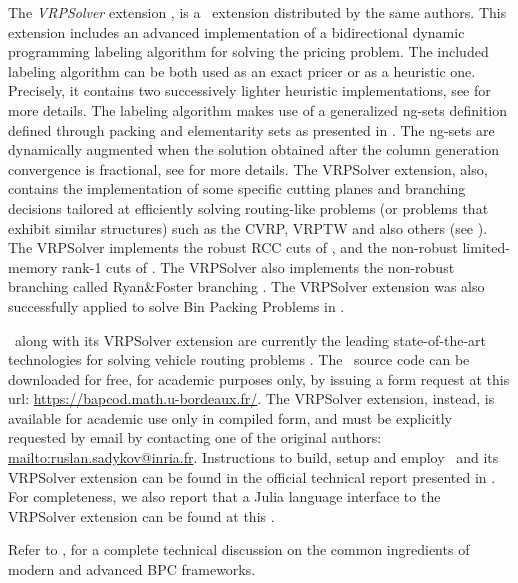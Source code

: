 The \textit{VRPSolver} extension \parencite{pessoa2020generic}, is
a \bapcod\ extension distributed by the same authors.
This extension includes an
advanced implementation of a bidirectional dynamic programming labeling algorithm
\parencite{sadykov2021bucket} for solving the pricing problem.
The included labeling algorithm
can be both used as an exact pricer or as a heuristic one.
Precisely, it contains two successively lighter heuristic implementations,
see \textcite{sadykov2021bucket} for more details.
The labeling algorithm makes use of a generalized ng-sets definition \parencite{baldacci2011}
defined through packing and elementarity sets as presented in \textcite{pessoa2020generic}.
The ng-sets are dynamically augmented \parencite{roberti2014}
when the solution obtained after the column generation convergence
is fractional,
see \textcite{pessoa2020generic} for more details.
The VRPSolver extension, also,
contains the implementation of some
specific cutting planes and branching decisions
tailored at efficiently solving routing-like problems
(or problems that exhibit similar structures)
such as the CVRP, VRPTW and also others (see \cite{pessoa2020generic}).
The VRPSolver implements the robust RCC cuts of \textcite{laporte1983},
and the non-robust limited-memory rank-1 cuts of \textcite{pecin2017improved}.
The VRPSolver also implements the non-robust branching called Ryan\&Foster branching \parencite{ryan1981integer}.
The VRPSolver extension was also successfully applied
to solve Bin Packing Problems in \textcite{pessoa2020}.

\medskip

\bapcod\ along with its VRPSolver extension are currently the leading state-of-the-art
technologies for solving vehicle routing problems \parencite{pessoa2020generic}.
The \bapcod\ source code can be downloaded for free, for academic purposes only,
by issuing a form request at this url: \url{https://bapcod.math.u-bordeaux.fr/}.
The VRPSolver extension, instead, is available for academic use only in compiled form,
and must be explicitly requested by email by contacting one of the
original authors: \url{mailto:ruslan.sadykov@inria.fr}.
Instructions to build, setup and employ \bapcod\ and its VRPSolver extension
can be found in the official technical report presented in \textcite{sadykov2021}.
For completeness, we also report that
a Julia language interface to the VRPSolver extension
can be found at this
.

Refer to \textcite{sadykov2019modern},
for a complete technical discussion on the common ingredients of modern and advanced BPC frameworks.

